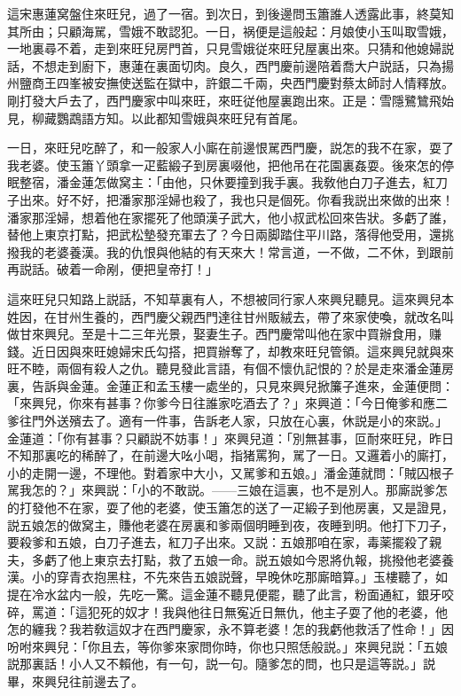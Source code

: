 這宋惠蓮窝盤住來旺兒，過了一宿。到次日，到後邊問玉簫誰人透露此事，終莫知其所由；只顧海駡，雪娥不敢認犯。一日，祸便是這般起：月娘使小玉叫取雪娥，一地裏尋不着，走到來旺兒房門首，只見雪娥従來旺兒屋裏出來。只猜和他媳婦説話，不想走到廚下，惠蓮在裏面切肉。良久，西門慶前邊陪着喬大户説話，只為揚州鹽商王四峯被安撫使送監在獄中，許銀二千兩，央西門慶對蔡太師討人情釋放。剛打發大戶去了，西門慶家中叫來旺，來旺従他屋裏跑出來。正是：雪隱鷺鷥飛始見，柳藏鸚鵡語方知。以此都知雪娥與來旺兒有首尾。

一日，來旺兒吃醉了，和一般家人小廝在前邊恨駡西門慶，説怎的我不在家，耍了我老婆。使玉簫丫頭拿一疋藍緞子到房裏啜他，把他吊在花園裏姦耍。後來怎的停眠整宿，潘金蓮怎做窝主：「由他，只休要撞到我手裏。我敎他白刀子進去，紅刀子出來。好不好，把潘家那淫婦也殺了，我也只是個死。你看我説出來做的出來！潘家那淫婦，想着他在家擺死了他頭漢子武大，他小叔武松回來告狀。多虧了誰，替他上東京打點，把武松墊發充軍去了？今日兩脚踏住平川路，落得他受用，還挑撥我的老婆養漢。我的仇恨與他結的有天來大！常言道，一不做，二不休，到跟前再説話。破着一命剐，便把皇帝打！」

這來旺兒只知路上説話，不知草裏有人，不想被同行家人來興兒聽見。這來興兒本姓因，在甘州生養的，西門慶父親西門達往甘州販絨去，帶了來家使喚，就改名叫做甘來興兒。至是十二三年光景，娶妻生子。西門慶常叫他在家中買辦食用，赚錢。近日因與來旺媳婦宋氏勾搭，把買辦奪了，却教來旺兒管領。這來興兒就與來旺不睦，兩個有殺人之仇。聽見發此言語，有個不懷仇記恨的？於是走來潘金蓮房裏，告訴與金蓮。金蓮正和孟玉樓一處坐的，只見來興兒掀簾子進來，金蓮便問：「來興兒，你來有甚事？你爹今日往誰家吃酒去了？」來興道：「今日俺爹和應二爹往門外送殯去了。適有一件事，告訴老人家，只放在心裏，休説是小的來説。」金蓮道：「你有甚事？只顧説不妨事！」來興兒道：「別無甚事，叵耐來旺兒，昨日不知那裏吃的稀醉了，在前邊大吆小喝，指猪罵狗，駡了一日。又邏着小的廝打，小的走開一邊，不理他。對着家中大小，又駡爹和五娘。」潘金蓮就問：「賊囚根子駡我怎的？」來興説：「小的不敢説。——三娘在這裏，也不是別人。那廝説爹怎的打發他不在家，耍了他的老婆，使玉簫怎的送了一疋緞子到他房裏，又是證見，説五娘怎的做窝主，賺他老婆在房裏和爹兩個明睡到夜，夜睡到明。他打下刀子，要殺爹和五娘，白刀子進去，紅刀子出來。又説：五娘那咱在家，毒薬擺殺了親夫，多虧了他上東京去打點，救了五娘一命。説五娘如今恩將仇報，挑撥他老婆養漢。小的穿青衣抱黑柱，不先來告五娘説聲，早晚休吃那廝暗算。」玉樓聽了，如提在冷水盆内一般，先吃一驚。這金蓮不聽見便罷，聽了此言，粉面通紅，銀牙咬碎，罵道：「這犯死的奴才！我與他往日無寃近日無仇，他主子耍了他的老婆，他怎的纏我？我若敎這奴才在西門慶家，永不算老婆！怎的我虧他救活了性命！」因吩咐來興兒：「你且去，等你爹來家問你時，你也只照恁般説。」來興兒説：「五娘説那裏話！小人又不賴他，有一句，説一句。隨爹怎的問，也只是這等説。」説畢，來興兒往前邊去了。

